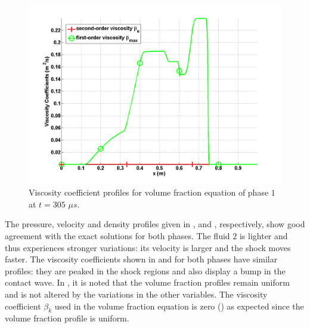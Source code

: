\begin{figure}[H]
\centering
\includegraphics[width=\textwidth]{figures/SEM/two_phases_liquid_beta.png}
\caption{Viscosity coefficient profiles for volume fraction equation of phase $1$ at $t=305$ $\mu s$.}
\label{fig:two-indep-fluids-vf-visc-1-7-eqn-sect4}
\end{figure}
%
The pressure, velocity and density profiles given in ,  and , respectively, show good agreement with the exact solutions for both phases. The fluid $2$ is lighter and thus experiences stronger variations: its velocity is larger and the shock moves faster. The viscosity coefficients shown in  and  for both phases have similar profiles: they are peaked in the shock regions and also display a bump in the contact wave. In , it is noted that the volume fraction profiles remain uniform and is not altered by the variations in the other variables. The viscosity coefficient $\beta_k$ used in the volume fraction equation is zero () as expected since the volume fraction profile is uniform.

